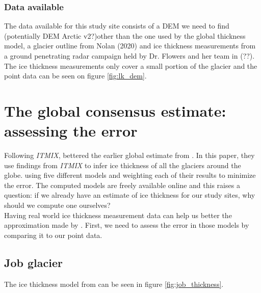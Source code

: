 \documentclass[a4, 12pt]{article}
\begin{document}
\subsubsection{Data available}
The data available for this study site consists of a DEM we need to find (potentially DEM Arctic v2?)other than the one used by the global thickness model, a glacier outline from Nolan (2020) and ice thickness measurements from a ground penetrating radar campaign held by Dr. Flowers and her team in (??). The ice thickness measurements only cover a small portion of the glacier and the point data can be seen on figure \ref{fig:lk_dem}.

\section{The global consensus estimate: assessing the error}
Following \textit{ITMIX}, \citeauthor{farinotti2019consensus} bettered the earlier global estimate from \citeauthor{huss2012distributed} \citeyear{huss2012distributed}. In this paper, they use findings from \textit{ITMIX} to infer ice thickness of all the glaciers around the globe. using five different models and weighting each of their results to minimize the error. The computed models are freely available online and this raises a question: if we already have an estimate of ice thickness for our study sites, why should we compute one ourselves?\\ Having real world ice thickness measurement data can help us better the approximation made by \citeauthor{farinotti2019consensus} \citeyear{farinotti2019consensus}. First, we need to assess the error in those models by comparing it to our point data.

\subsection{Job glacier}
The ice thickness model from \citeauthor{farinotti2019consensus} \citeyear{farinotti2019consensus} can be seen in figure \ref{fig:job_thickness}.
\end{document}
